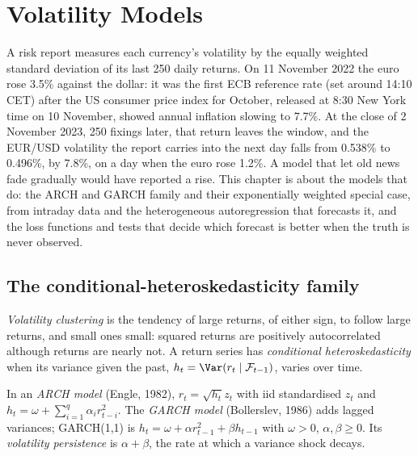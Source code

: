 \chapter{Volatility Models}\label{ch:qm:volatility-models}

A risk report measures each currency's volatility by the equally weighted standard deviation of its last 250 daily returns. On 11 November
2022 the euro rose 3.5\% against the dollar: it was the first ECB reference rate (set around 14:10 CET) after the US consumer price index for October, released
at 8:30 New York time on 10 November, showed annual inflation slowing to 7.7\%. At the close of 2 November 2023, 250 fixings later, that return leaves the window, and the
EUR/USD volatility the report carries into the next day falls from 0.538\% to 0.496\%, by 7.8\%, on a day when the euro rose 1.2\%. A model
that let old news fade gradually would have reported a rise. This chapter is about the models that do: the ARCH and GARCH family and their
exponentially weighted special case,  from intraday data and the heterogeneous autoregression that forecasts it, and the loss
functions and tests that decide which forecast is better when the truth is never observed.

\section{The conditional-heteroskedasticity family}

\begin{definition}\label{def:qm:volatility-models:clustering}
\emph{Volatility clustering} is the tendency of large returns, of either sign, to follow large returns, and small
ones small: squared returns are positively autocorrelated although returns are nearly not. A return series has \emph{conditional
heteroskedasticity} when its variance given the past, $h_t = \Var(r_t \mid \mathcal F_{t-1})$, varies over time.
\end{definition}

\begin{definition}\label{def:qm:volatility-models:garch}
In an \emph{ARCH model} (Engle, 1982), $r_t = \sqrt{h_t}z_t$ with iid standardised $z_t$ and $h_t = \omega + \sum_{i=1}^q\alpha_ir_{t-i}^2$.
The \emph{GARCH model} (Bollerslev, 1986) adds lagged variances; GARCH(1,1) is $h_t = \omega + \alpha r_{t-1}^2 + \beta h_{t-1}$ with $\omega > 0$,
$\alpha, \beta \ge 0$. Its \emph{volatility persistence} is $\alpha + \beta$, the rate at which a variance shock decays.
\end{definition}

